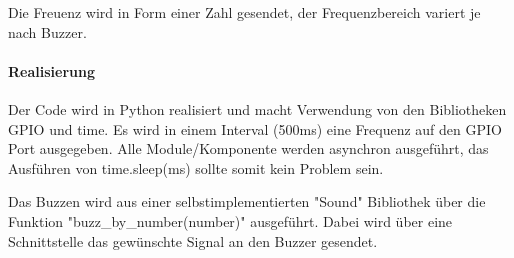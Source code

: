 \documentclass[../../main.tex]{subfiles}
\begin{document}
Die Freuenz wird in Form einer Zahl gesendet, der Frequenzbereich variert je nach Buzzer.

\paragraph{Realisierung}
Der Code wird in Python realisiert und macht Verwendung von den Bibliotheken GPIO und time. Es wird in einem Interval (500ms) eine Frequenz auf den GPIO Port ausgegeben. Alle Module/Komponente werden asynchron ausgeführt, das Ausführen von time.sleep(ms) sollte somit kein Problem sein.

Das Buzzen wird aus einer selbstimplementierten "Sound" Bibliothek über die Funktion "buzz\_by\_number(number)" ausgeführt. Dabei wird über eine Schnittstelle das gewünschte Signal an den Buzzer gesendet.
\end{document}
